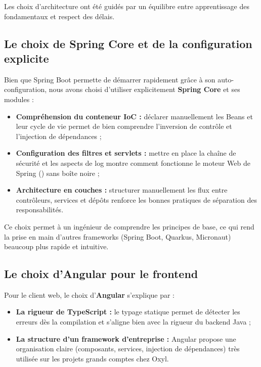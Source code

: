 \documentclass{tnreport}
\begin{document}
Les choix d'architecture ont été guidés par un équilibre entre apprentissage des fondamentaux et respect des délais.

\subsection{Le choix de Spring Core et de la configuration explicite}
\label{subsec:choix_spring_core}

Bien que Spring Boot permette de démarrer rapidement grâce à son auto-configuration, nous avons choisi d'utiliser explicitement \textbf{Spring Core} et ses modules :
\begin{itemize}
    \item \textbf{Compréhension du conteneur IoC :} déclarer manuellement les Beans et leur cycle de vie permet de bien comprendre l'inversion de contrôle et l'injection de dépendances ;
    \item \textbf{Configuration des filtres et servlets :} mettre en place la chaîne de sécurité et les aspects de log montre comment fonctionne le moteur Web de Spring () sans boîte noire ;
    \item \textbf{Architecture en couches :} structurer manuellement les flux entre contrôleurs, services et dépôts renforce les bonnes pratiques de séparation des responsabilités.
\end{itemize}

Ce choix permet à un ingénieur de comprendre les principes de base, ce qui rend la prise en main d'autres frameworks (Spring Boot, Quarkus, Micronaut) beaucoup plus rapide et intuitive.

\subsection{Le choix d'Angular pour le frontend}
\label{subsec:choix_angular}

Pour le client web, le choix d'\textbf{Angular} s'explique par :
\begin{itemize}
    \item \textbf{La rigueur de TypeScript :} le typage statique permet de détecter les erreurs dès la compilation et s'aligne bien avec la rigueur du backend Java ;
    \item \textbf{La structure d'un framework d'entreprise :} Angular propose une organisation claire (composants, services, injection de dépendances) très utilisée sur les projets grands comptes chez Oxyl.
\end{itemize}
\end{document}
